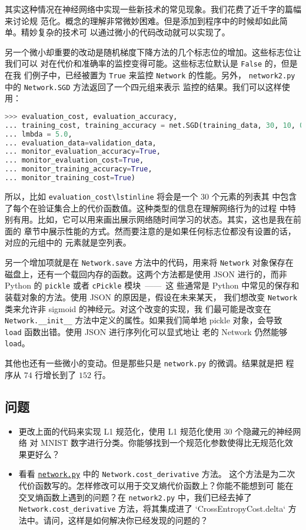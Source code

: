 其实这种情况在神经网络中实现一些新技术的常见现象。我们花费了近千字的篇幅来讨论规
范化。概念的理解非常微妙困难。但是添加到程序中的时候却如此简单。精妙复杂的技术可
以通过微小的代码改动就可以实现了。

另一个微小却重要的改动是随机梯度下降方法的几个标志位的增加。这些标志位让我们可以
对在代价和准确率的监控变得可能。这些标志位默认是 \lstinline!False! 的，但是在我
们例子中，已经被置为 \lstinline!True! 来监控 \lstinline!Network! 的性能。另外，
\lstinline!network2.py! 中的 \lstinline!Network.SGD! 方法返回了一个四元组来表示
监控的结果。我们可以这样使用：
\begin{lstlisting}[language=Python]
>>> evaluation_cost, evaluation_accuracy, 
... training_cost, training_accuracy = net.SGD(training_data, 30, 10, 0.5,
... lmbda = 5.0,
... evaluation_data=validation_data,
... monitor_evaluation_accuracy=True,
... monitor_evaluation_cost=True,
... monitor_training_accuracy=True,
... monitor_training_cost=True)
\end{lstlisting}

所以，比如 \lstinline!evaluation_cost\lstinline! 将会是一个 $30$ 个元素的列表其
中包含了每个\epoch{}在验证集合上的代价函数值。这种类型的信息在理解网络行为的过程
中特别有用。比如，它可以用来画出展示网络随时间学习的状态。其实，这也是我在前面的
章节中展示性能的方式。然而要注意的是如果任何标志位都没有设置的话，对应的元组中的
元素就是空列表。

另一个增加项就是在 \lstinline!Network.save! 方法中的代码，用来将
\lstinline!Network! 对象保存在磁盘上，还有一个载回内存的函数。这两个方法都是使用
JSON 进行的，而非 Python 的 \lstinline!pickle! 或者 \lstinline!cPickle! 模块~——~这
些通常是 Python 中常见的保存和装载对象的方法。使用 JSON 的原因是，假设在未来某天，
我们想改变 \lstinline!Network! 类来允许非 sigmoid 的神经元。对这个改变的实现，我
们最可能是改变在 \lstinline!Network.__init__! 方法中定义的属性。如果我们简单地
pickle 对象，会导致 \lstinline!load! 函数出错。使用 JSON 进行序列化可以显式地让
老的 Network 仍然能够 \lstinline!load!。

其他也还有一些微小的变动。但是那些只是 \lstinline!network.py! 的微调。结果就是把
程序从 $74$ 行增长到了 $152$ 行。

\subsection*{问题}

\begin{itemize}
\item 更改上面的代码来实现 L1 规范化，使用 L1 规范化使用 $30$ 个隐藏元的神经网络
  对 MNIST 数字进行分类。你能够找到一个规范化参数使得比无规范化效果更好么？
\item 看看 \href{https://github.com/mnielsen/neural-networks-and-deep-learning/blob/master/src/network.py}{\lstinline!network.py!} 中的 \lstinline!Network.cost_derivative! 方法。
  这个方法是为二次代价函数写的。怎样修改可以用于交叉熵代价函数上？你能不能想到可
  能在交叉熵函数上遇到的问题？在 \lstinline!network2.py! 中，我们已经去掉了
  \lstinline!Network.cost_derivative! 方法，将其集成进了
  `CrossEntropyCost.delta` 方法中。请问，这样是如何解决你已经发现的问题的？
\end{itemize}

